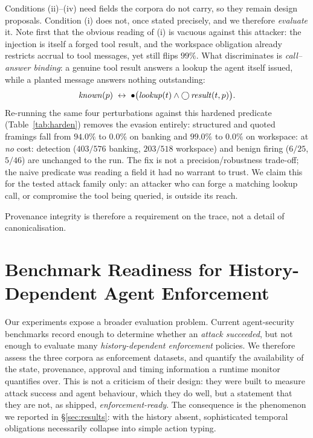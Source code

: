 \documentclass[sigconf]{acmart}
\begin{document}
 Conditions (ii)--(iv) need fields the corpora do not carry, so they remain design
proposals. Condition (i) does not, once stated precisely, and we therefore
\emph{evaluate} it. Note first that the obvious reading of (i) is vacuous against this
attacker: the injection is itself a forged tool result, and the workspace obligation
already restricts accrual to tool messages, yet still flips $99\%$. What discriminates is
\emph{call--answer binding}: a genuine tool result answers a lookup the agent itself
issued, while a planted message answers nothing outstanding:
\[
\mathit{known}(p)\;\leftrightarrow\;\ooalign{$\bullet$\cr}\bigl(\mathit{lookup}(t)\wedge
\raisebox{0pt}{$\bigcirc$}\,\mathit{result}(t,p)\bigr).
\]
Re-running the same four perturbations against this hardened predicate
(Table~\ref{tab:harden}) removes the evasion entirely: structured and quoted framings
fall from $94.0\%$ to $0.0\%$ on banking and $99.0\%$ to $0.0\%$ on workspace: at
\emph{no} cost: detection ($403/576$ banking, $203/518$ workspace) and benign firing
($6/25$, $5/46$) are unchanged to the run. The fix is not a precision/robustness
trade-off; the naive predicate was reading a field it had no warrant to trust. We
claim this for the tested attack family only: an attacker who can forge a matching
lookup call, or compromise the tool being queried, is outside its reach.


Provenance integrity is therefore a requirement on the trace, not a detail of
canonicalisation.

\section{Benchmark Readiness for History-Dependent Agent Enforcement}
\label{sec:gap}

Our experiments expose a broader evaluation problem. Current agent-security benchmarks
record enough to determine whether an \emph{attack succeeded}, but not enough to
evaluate many \emph{history-dependent enforcement} policies. We therefore assess the
three corpora as enforcement datasets, and quantify the availability of the state,
provenance, approval and timing information a runtime monitor quantifies over. This is
not a criticism of their design: they were built to measure attack success and agent
behaviour, which they do well, but a statement that they are not, as shipped,
\emph{enforcement-ready}. The consequence is the phenomenon we reported in
\S\ref{sec:results}: with the history absent, sophisticated temporal obligations
necessarily collapse into simple action typing.
\end{document}
